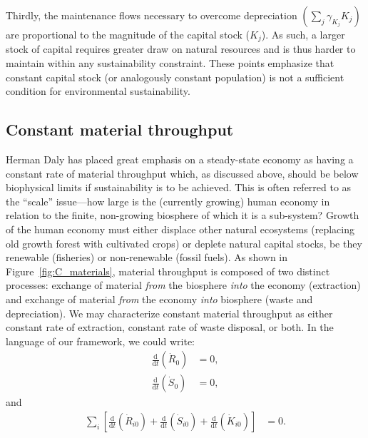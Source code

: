 Thirdly,
the maintenance flows necessary to overcome
depreciation
$\left(\sum_{j}\gamma_{K_{j}}K_{j}\right)$
are proportional to the magnitude of the capital
stock ($K_{j}$).
As such,
a larger stock of capital requires
greater draw on natural resources and is thus harder
to maintain within any sustainability constraint.
These points emphasize that constant capital stock
(or analogously constant population)
is not a sufficient condition for environmental sustainability.


\subsection{Constant material throughput}

Herman Daly has placed great emphasis on a steady-state
economy as having a constant rate of material throughput 
\cite{Daly1977, Daly1997}
which, as discussed above, should be below biophysical limits
if sustainability is to be achieved.
This is often referred to as the ``scale'' issue---how 
large is the (currently growing) human economy in relation
to the finite, non-growing biosphere of which it is a sub-system?
Growth of the human economy must either displace other natural
ecosystems (replacing old growth forest with cultivated crops)
or deplete natural capital stocks, be they 
renewable (fisheries) or 
non-renewable (fossil fuels).
As shown in Figure~\ref{fig:C_materials},
material throughput is composed of two distinct processes:
exchange of material \emph{from} the biosphere 
\emph{into} the economy (extraction)
and exchange of material \emph{from} the economy
\emph{into} biosphere (waste and depreciation).
We may characterize constant material throughput
as either constant rate of extraction, constant rate of
waste disposal, or both.
In the language of our framework, we could write:
%
\begin{align}\label{eq:const_throughput}
	\frac{\mathrm{d}}{\mathrm{d}t}\left(\dot{R}_{0}\right)		&
	= 0,																							\\
	\frac{\mathrm{d}}{\mathrm{d}t}\left(\dot{S}_{0}\right)		&
	= 0,
\end{align}
%
and
%
\begin{align}
	\sum\limits_{i}
			\left[
				\frac{\mathrm{d}}{\mathrm{d}t}\left(\dot{R}_{i0}\right)
				+ \frac{\mathrm{d}}{\mathrm{d}t}\left(\dot{S}_{i0}\right)
				+ \frac{\mathrm{d}}{\mathrm{d}t}\left(\dot{K}_{i0}\right)
			\right]																			&
	= 0.
\end{align}

